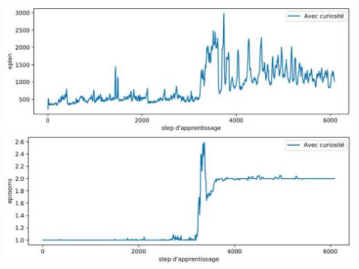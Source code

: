 \documentclass[a4paper,12pt]{report}
\begin{document}
    \includegraphics[width=\textwidth]{curiosity_only/curiosity_eplen.JPG}
    \includegraphics[width=\textwidth]{curiosity_only/curiosity_eprooms.JPG}

\newpage
\end{document}
